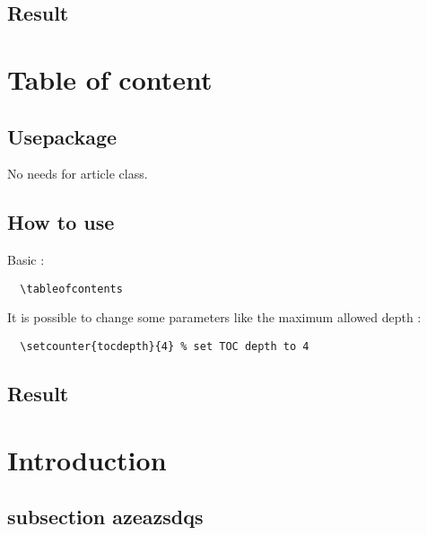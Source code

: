 \documentclass[a4paper,12pt]{article}
\begin{document}
\subsection{Result}

\begin{abstract}
\blindtext
\end{abstract}


\newpage
\section{Table of content}
\subsection{Usepackage}
No needs for article class.
\subsection{How to use}
Basic :
\begin{verbatim}
  \tableofcontents
\end{verbatim}
It is possible to change some parameters like the maximum allowed depth :
\begin{verbatim}
  \setcounter{tocdepth}{4} % set TOC depth to 4
\end{verbatim}
\subsection{Result}
  \tableofcontents







\newpage
\section{Introduction}


\subsection{subsection azeazsdqs}
\blindtext \\
\end{document}
